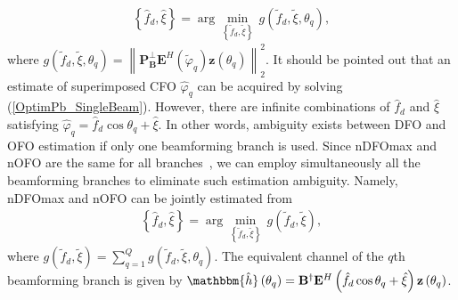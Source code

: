 \documentclass[12pt, draftclsnofoot, onecolumn]{IEEEtran}
\begin{document}
\begin{align}\label{OptimPb_SingleBeam}
\left\{{\hat{f}}_{d}, \hat{\xi}\right\} = \arg \underset{\left\{{{\tilde{f}}}_{d}, \tilde{\xi }\right\}}{\mathop{\min }}\,{g\left( {{{\tilde{f}}}_{d}}, \tilde{\xi }, {{\theta }_{q}} \right)},
\end{align}
where $g\left( {{{\tilde{f}}}_{d}}, \tilde{\xi }, {{\theta }_{q}} \right) = \left\| \mathbf{P}_{\mathbf{B}}^{\bot }{{\mathbf{E}}^{H}}\left( \tilde{\varphi}_{q} \right)\mathbf{z}\left( \theta_{q}  \right) \right\|_{2}^{2}$.
It should be pointed out that an estimate of superimposed CFO $\hat{\varphi}_q$ can be acquired by solving (\ref{OptimPb_SingleBeam}). However, there are infinite combinations of $\hat{f}_d$ and $\hat{\xi}$ satisfying $\hat{\varphi}_q \!=\! \hat{f}_d \cos\theta_q \!+\! \hat{\xi}$. In other words, ambiguity exists between DFO and OFO estimation if only one beamforming branch is used. Since nDFOmax and nOFO are the same for all branches~\cite{C_Tepedelenlioglu2001TVT}, we can employ simultaneously all the beamforming branches to eliminate such estimation ambiguity. Namely, nDFOmax and nOFO can be jointly estimated from
\begin{align}\label{OptimPb1}
\left\{{{\hat{f}}}_{d}, \hat{\xi }\right\}=\arg \underset{\left\{{{\tilde{f}}}_{d}, \tilde{\xi}\right\}}{\mathop{\min }}\, {g\left( {{{\tilde{f}}}_{d}}, \tilde{\xi } \right)},
\end{align}
where $g\left( {{{\tilde{f}}}_{d}}, \tilde{\xi } \right) = \sum\nolimits_{q=1}^{Q}{g\left( {{{\tilde{f}}}_{d}}, \tilde{\xi }, {{\theta }_{q}} \right)}$.
The equivalent channel of the $q$th beamforming branch is given by $\mathbbm{\hat{h}}\left( {{\theta }_{q}} \right)={{\mathbf{B}}^{\dagger }}{{\mathbf{E}}^{H}}\left( {{{\hat{f}}}_{d}}\cos {{\theta }_{q}}+\hat{\xi } \right)\mathbf{z}\left( {{\theta }_{q}} \right)$.
\end{document}
